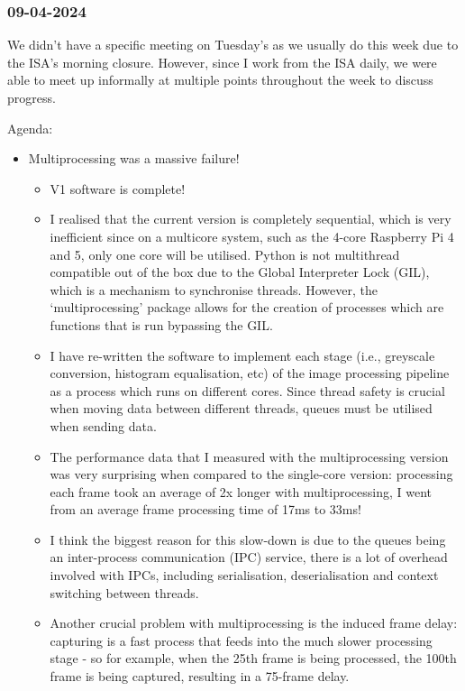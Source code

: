 \subsubsection{09-04-2024}
We didn't have a specific meeting on Tuesday's as we usually do this week due to the ISA's morning closure. However, since I work from the ISA daily, we were able to meet up informally at multiple points throughout the week to discuss progress.

Agenda:

\begin{itemize}
    \item Multiprocessing was a massive failure!
    \begin{itemize}
        \item V1 software is complete!
        \item I realised that the current version is completely sequential, which is very inefficient since on a multicore system, such as the 4-core Raspberry Pi 4 and 5, only one core will be utilised. Python is not multithread compatible out of the box due to the Global Interpreter Lock (GIL), which is a mechanism to synchronise threads. However, the `multiprocessing' package allows for the creation of processes which are functions that is run bypassing the GIL.
        \item I have re-written the software to implement each stage (i.e., greyscale conversion, histogram equalisation, etc) of the image processing pipeline as a process which runs on different cores. Since thread safety is crucial when moving data between different threads, queues must be utilised when sending data.
        \item The performance data that I measured with the multiprocessing version was very surprising when compared to the single-core version: processing each frame took an average of 2x longer with multiprocessing, I went from an average frame processing time of 17ms to 33ms!
        \item I think the biggest reason for this slow-down is due to the queues being an inter-process communication (IPC) service, there is a lot of overhead involved with IPCs, including serialisation, deserialisation and context switching between threads.
        \item Another crucial problem with multiprocessing is the induced frame delay: capturing is a fast process that feeds into the much slower processing stage - so for example, when the 25th frame is being processed, the 100th frame is being captured, resulting in a 75-frame delay.

\end{itemize}
\end{itemize}
